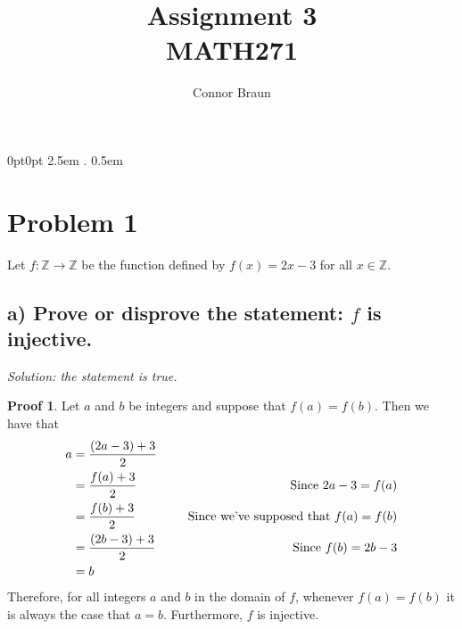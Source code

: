 \documentclass[11pt, letterpaper]{article}
\begin{document}
\title{Assignment 3\\\normalsize MATH271}
\author{Connor Braun}

\allowdisplaybreaks

\theoremstyle{definition}
\newtheorem*{prf}{Proof}
\newtheorem{recipe}{Recipe}
\newtheorem*{sol}{Solution}
\newtheorem{case}{Case}
    {0pt}{0pt}
    {\hangindent 2.5em}
    {}
    {\bfseries}
    {.}
    {0.5em}
    {}
\theoremstyle{mythrm}
\newtheorem{lemma}{Lemma}

\maketitle
\section*{Problem 1}
{\large Let $f: \mathbb{Z}\rightarrow\mathbb{Z}$ be the function defined by $f(x)=2x-3$ for all $x\in \mathbb{Z}$.}
\subsection*{a) Prove or disprove the statement: $f$ is injective.}
{\large\it Solution: the statement is true.}
\begin{prf}
    Let $a$ and $b$ be integers and suppose that $f(a)=f(b)$. Then we have that
    \begin{align*}
        a&=\frac{(2a-3)+3}{2}\\
        &=\frac{f(a)+3}{2} &\text{\indent Since $2a-3=f(a)$}\\
        &=\frac{f(b)+3}{2} &\text{\indent Since we've supposed that $f(a)=f(b)$}\\
        &=\frac{(2b-3)+3}{2} &\text{\indent Since $f(b)=2b-3$}\\
        &= b
    \end{align*}
    Therefore, for all integers $a$ and $b$ in the domain of $f$, whenever $f(a)=f(b)$ it is always the case that $a=b$. Furthermore, $f$ is injective. 
\end{prf}
\end{document}

